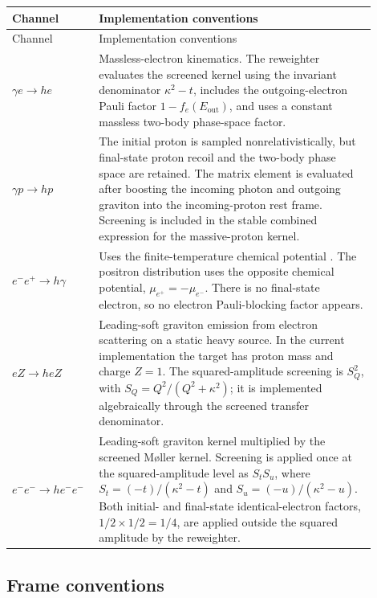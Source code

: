 \documentclass[11pt,a4paper]{article}
\newcommand{\code}[1]{\texttt{\detokenize{#1}}}
\begin{document}
\small
\begin{longtable}{p{0.18\linewidth}p{0.72\linewidth}}
\toprule
Channel & Implementation conventions \\
\midrule
\endfirsthead
\toprule
Channel & Implementation conventions \\
\midrule
\endhead
$\gamma e\to he$ & Massless-electron kinematics. The reweighter evaluates the screened kernel using the invariant denominator $\kappa^2-t$, includes the outgoing-electron Pauli factor $1-f_e(E_{\mathrm{out}})$, and uses a constant massless two-body phase-space factor. \\
\addlinespace
$\gamma p\to hp$ & The initial proton is sampled nonrelativistically, but final-state proton recoil and the two-body phase space are retained. The matrix element is evaluated after boosting the incoming photon and outgoing graviton into the incoming-proton rest frame. Screening is included in the stable combined expression for the massive-proton kernel. \\
\addlinespace
$e^-e^+\to h\gamma$ & Uses the finite-temperature chemical potential \code{mu_precise_GeV}. The positron distribution uses the opposite chemical potential, $\mu_{e^+}=-\mu_{e^-}$. There is no final-state electron, so no electron Pauli-blocking factor appears. \\
\addlinespace
$eZ\to heZ$ & Leading-soft graviton emission from electron scattering on a static heavy source. In the current implementation the target has proton mass and charge $Z=1$. The squared-amplitude screening is $S_Q^2$, with $S_Q=Q^2/(Q^2+\kappa^2)$; it is implemented algebraically through the screened transfer denominator. \\
\addlinespace
$e^-e^-\to he^-e^-$ & Leading-soft graviton kernel multiplied by the screened M\o ller kernel. Screening is applied once at the squared-amplitude level as $S_tS_u$, where $S_t=(-t)/(\kappa^2-t)$ and $S_u=(-u)/(\kappa^2-u)$. Both initial- and final-state identical-electron factors, $1/2\times1/2=1/4$, are applied outside the squared amplitude by the reweighter. \\
\bottomrule
\end{longtable}
\normalsize

\subsection{Frame conventions}
\end{document}
